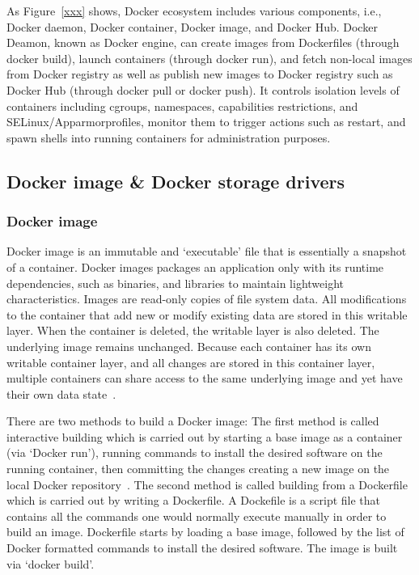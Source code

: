 
As Figure~\ref{xxx} shows, Docker ecosystem includes various components, i.e., Docker daemon, Docker container, Docker image, and Docker Hub. Docker Deamon, known as Docker engine, can create images from Dockerfiles (through docker build), launch containers (through docker run), and fetch non-local images from Docker registry as well as publish new images to Docker registry such as Docker Hub (through docker pull or docker push). It controls isolation levels of containers including cgroups, namespaces, capabilities restrictions, and SELinux/Apparmorprofiles, monitor them to trigger actions such as restart, and spawn shells into running containers for administration purposes. 

 
 
\subsection{Docker image \& Docker storage drivers}

\subsubsection{Docker image}

Docker image is an immutable and `executable' file that is essentially a snapshot of a container. Docker images packages an application only with its runtime dependencies, such as binaries, and libraries to maintain lightweight characteristics. Images are read-only copies of file system data. All modifications to the container that add new or modify existing data are stored in this writable layer. When the container is deleted, the writable layer is also deleted. The underlying image remains unchanged. Because each container has its own writable container layer, and all changes are stored in this container layer, multiple containers can share access to the same underlying image and yet have their own data state~\cite{}. 

There are two methods to build a Docker image: The first method is called interactive building which is carried out by starting a base image as a container (via `Docker run'), running commands to install the desired software on the running container, then committing the changes creating a new image on the local Docker repository~\cite{}. The second method is called building from a Dockerfile which is carried out by writing a Dockerfile. A Dockefile is a script file that contains all the commands one would normally execute manually in order to build an image. Dockerfile starts by loading a base image, followed by the list of Docker formatted commands to install the desired software. The image is built via `docker build'. 

